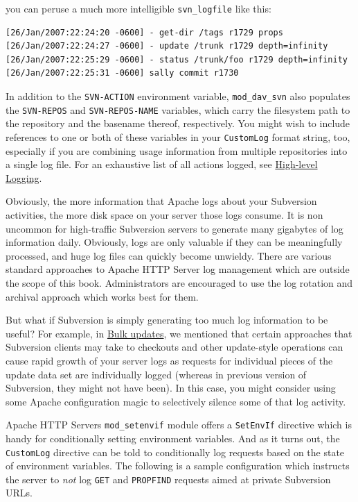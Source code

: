 you can peruse a much more intelligible \texttt{svn\_logfile} like this:

\begin{verbatim}
[26/Jan/2007:22:24:20 -0600] - get-dir /tags r1729 props
[26/Jan/2007:22:24:27 -0600] - update /trunk r1729 depth=infinity
[26/Jan/2007:22:25:29 -0600] - status /trunk/foo r1729 depth=infinity
[26/Jan/2007:22:25:31 -0600] sally commit r1730
\end{verbatim}

In addition to the \texttt{SVN-ACTION} environment variable,
\texttt{mod\_dav\_svn} also populates the \texttt{SVN-REPOS} and
\texttt{SVN-REPOS-NAME} variables, which carry the filesystem path to
the repository and the basename thereof, respectively. You might wish to
include references to one or both of these variables in your
\texttt{CustomLog} format string, too, especially if you are combining
usage information from multiple repositories into a single log file. For
an exhaustive list of all actions logged, see
\hyperref[svn.serverconfig.operational-logging]{High-level Logging}.

Obviously, the more information that Apache logs about your Subversion
activities, the more disk space on your server those logs consume. It is
non uncommon for high-traffic Subversion servers to generate many
gigabytes of log information daily. Obviously, logs are only valuable if
they can be meaningfully processed, and huge log files can quickly
become unwieldy. There are various standard approaches to Apache HTTP
Server log management which are outside the scope of this book.
Administrators are encouraged to use the log rotation and archival
approach which works best for them.

But what if Subversion is simply generating too much log information to
be useful? For example, in
\hyperref[svn.serverconfig.httpd.perf.bulk-updates]{Bulk updates}, we
mentioned that certain approaches that Subversion clients may take to
checkouts and other update-style operations can cause rapid growth of
your server logs as requests for individual pieces of the update data
set are individually logged (whereas in previous version of Subversion,
they might not have been). In this case, you might consider using some
Apache configuration magic to selectively silence some of that log
activity.

Apache HTTP Server\textquotesingle s \texttt{mod\_setenvif} module
offers a \texttt{SetEnvIf} directive which is handy for conditionally
setting environment variables. And as it turns out, the
\texttt{CustomLog} directive can be told to conditionally log requests
based on the state of environment variables. The following is a sample
configuration which instructs the server to \emph{not} log \texttt{GET}
and \texttt{PROPFIND} requests aimed at private Subversion URLs.


